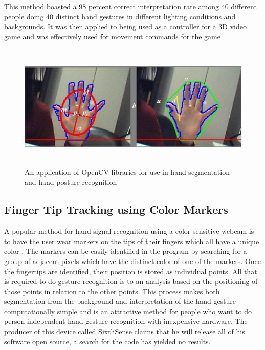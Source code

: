 \documentclass[a4paper,12pt]{report}
\begin{document}
This method boasted a 98 percent correct interpretation rate among 40 different people doing 40 distinct hand gestures in different lighting conditions and backgrounds. It was then applied to being used as a controller for a 3D video game and was effectively used for movement commands for the game

\begin{figure}[H]
\centering
\includegraphics[height=60mm] {opencv.eps}
\caption{An application of OpenCV libraries for use in hand segmentation and hand posture recognition}
\end{figure}



\subsection{Finger Tip Tracking using Color Markers}

A popular method for hand signal recognition using a color sensitive webcam is to have the user wear markers on the tips of their fingers which all have a unique color \cite{sixthsense}. The markers can be easily identified in the program by searching for a group of adjacent pixels which have the distinct color of one of the markers. Once the fingertips are identified, their position is stored as individual points. All that is required to do gesture recognition is to an analysis based on the positioning of those points in relation to the other points. This process makes both segmentation from the background and interpretation of the hand gesture computationally simple and is an attractive method for people who want to do person independent hand gesture recognition with inexpensive hardware. The producer of this device called SixthSense claims that he will release all of his software open source, a search for the code has yielded no results.
\end{document}
